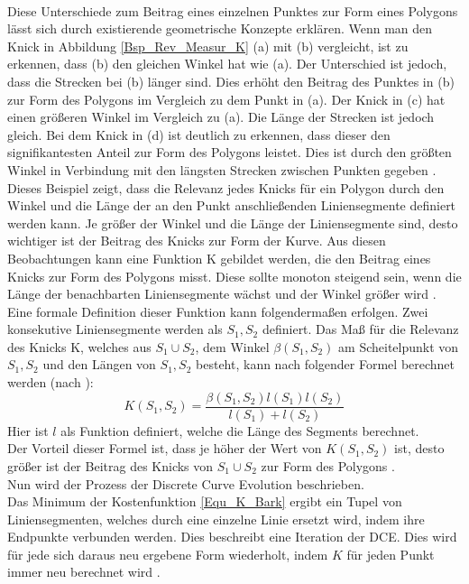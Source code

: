 {\\
Diese Unterschiede zum Beitrag eines einzelnen Punktes zur Form eines Polygons lässt sich durch existierende geometrische Konzepte erklären. Wenn man den Knick in Abbildung \ref{Bsp_Rev_Measur_K} (a) mit (b) vergleicht, ist zu erkennen, dass (b) den gleichen Winkel hat wie (a). Der Unterschied ist jedoch, dass die Strecken bei (b) länger sind. Dies erhöht den Beitrag des Punktes in (b) zur Form des Polygons im Vergleich zu dem Punkt in (a).
Der Knick in (c) hat einen größeren Winkel im Vergleich zu (a). Die Länge der Strecken ist jedoch gleich. Bei dem Knick in (d) ist deutlich zu erkennen, dass dieser den signifikantesten Anteil zur Form des Polygons leistet. Dies ist durch den größten Winkel in Verbindung mit den längsten Strecken zwischen Punkten gegeben \citep{Barkowsky2000}.
\\
Dieses Beispiel zeigt, dass die Relevanz jedes Knicks für ein Polygon durch den Winkel und die Länge der an den Punkt anschließenden Liniensegmente definiert werden kann. Je größer der Winkel und die Länge der Liniensegmente sind, desto wichtiger ist der Beitrag des Knicks zur Form der Kurve. Aus diesen Beobachtungen kann eine Funktion K gebildet werden, die den Beitrag eines Knicks zur Form des Polygons misst. Diese sollte monoton steigend sein, wenn die Länge der benachbarten Liniensegmente wächst und der Winkel größer wird \citep{Barkowsky2000}.
\\
Eine formale Definition dieser Funktion kann folgendermaßen erfolgen. Zwei konsekutive Liniensegmente werden als $S_1, S_2$ definiert. Das Maß für die Relevanz des Knicks K, welches aus $S_1 \cup S_2$, dem Winkel  $\beta(S_1, S_2)$ am Scheitelpunkt von $S_1,  S_2$ und den Längen von $S_1, S_2$ besteht, kann nach folgender Formel berechnet werden (nach \citet{Latecki1999a}):
\\
\begin{equation}
	K(S_1,S_2) = \frac{\beta(S_1,S_2)l(S_1)l(S_2)}{l(S_1) + l(S_2)} 
	\label{Equ_K_Bark} 
\end{equation}
 Hier ist $l$ als Funktion definiert, welche die Länge des Segments berechnet. \\
 Der Vorteil dieser Formel ist, dass je höher der Wert von $K(S_1, S_2)$ ist, desto größer ist der Beitrag des Knicks von $S_1 \cup S_2$ zur Form des Polygons \citep{Barkowsky2000}.
 \\
 Nun wird der Prozess der \glqq Discrete Curve Evolution\grqq{} beschrieben.\\ Das Minimum der Kostenfunktion \ref{Equ_K_Bark} ergibt ein Tupel von Liniensegmenten, welches durch eine einzelne Linie ersetzt wird, indem ihre Endpunkte verbunden werden. Dies beschreibt eine Iteration der DCE. Dies wird für jede sich daraus neu ergebene Form wiederholt, indem $K$ für jeden Punkt immer neu berechnet wird \citep{Barkowsky2000}.
}

